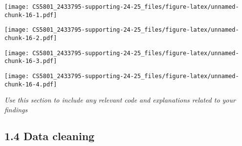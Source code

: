 \documentclass[
]{article}
\newenvironment{Shaded}{\begin{snugshade}}{\end{snugshade}}
\newcommand{\AttributeTok}[1]{\textcolor[rgb]{0.13,0.29,0.53}{#1}}
\newcommand{\CommentTok}[1]{\textcolor[rgb]{0.56,0.35,0.01}{\textit{#1}}}
\newcommand{\FunctionTok}[1]{\textcolor[rgb]{0.13,0.29,0.53}{\textbf{#1}}}
\newcommand{\NormalTok}[1]{#1}
\newcommand{\SpecialCharTok}[1]{\textcolor[rgb]{0.81,0.36,0.00}{\textbf{#1}}}
\newcommand{\StringTok}[1]{\textcolor[rgb]{0.31,0.60,0.02}{#1}}
\begin{document}
\texttt{[image: CS5801\_2433795-supporting-24-25\_files/figure-latex/unnamed-chunk-16-1.pdf]}

\begin{Shaded}
\end{Shaded}

\texttt{[image: CS5801\_2433795-supporting-24-25\_files/figure-latex/unnamed-chunk-16-2.pdf]}

\begin{Shaded}
\end{Shaded}

\texttt{[image: CS5801\_2433795-supporting-24-25\_files/figure-latex/unnamed-chunk-16-3.pdf]}

\begin{Shaded}
\end{Shaded}

\texttt{[image: CS5801\_2433795-supporting-24-25\_files/figure-latex/unnamed-chunk-16-4.pdf]}

\emph{Use this section to include any relevant code and explanations
related to your findings}

\subsection{1.4 Data cleaning}\label{data-cleaning}
\end{document}
